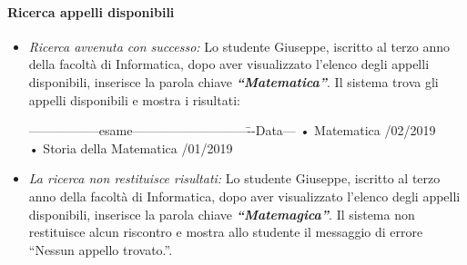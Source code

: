 \paragraph{Ricerca appelli disponibili}
\begin{itemize}
	\item \textit{Ricerca avvenuta con successo:}
	Lo studente Giuseppe, iscritto al terzo anno della facoltà di Informatica, dopo aver visualizzato l'elenco degli appelli disponibili, inserisce la parola chiave \textbf{\textit{“Matematica”}}. Il sistema trova gli appelli disponibili e mostra i risultati:
	\begin{tabbing}
		\hspace{1cm}-----------------esame---------------------------\=--Data---\kill
		\hspace{1cm} • Matematica  /02/2019  \\
		\hspace{1cm} • Storia della Matematica /01/2019 \\
	\end{tabbing}
	
	\item \textit{La ricerca non restituisce risultati:}
	Lo studente Giuseppe, iscritto al terzo anno della facoltà di Informatica, dopo aver visualizzato l'elenco degli appelli disponibili, inserisce la parola chiave \textbf{\textit{“Matemagica”}}. Il sistema non restituisce alcun riscontro e mostra allo studente il messaggio di errore “Nessun appello trovato.”.
\end{itemize}

